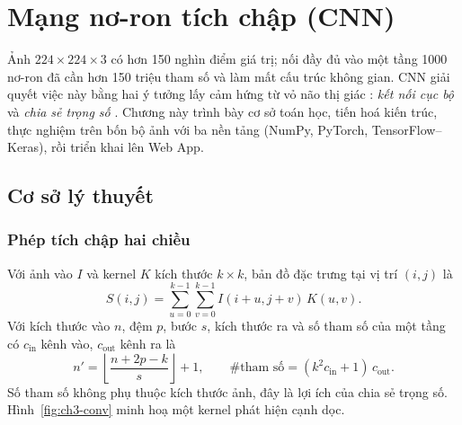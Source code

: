 \chapter{Mạng nơ-ron tích chập (CNN)}\label{chap:cnn}

Ảnh $224\times224\times3$ có hơn 150 nghìn điểm giá trị; nối đầy đủ vào một tầng 1000 nơ-ron đã cần hơn 150 triệu tham số và làm mất cấu trúc không gian. CNN giải quyết việc này bằng hai ý tưởng lấy cảm hứng từ
vỏ não thị giác \cite{ch3:hubel1962,ch3:fukushima1980}: \emph{kết nối cục bộ} và \emph{chia sẻ trọng số} \cite{ch3:lecun1989,ch1:lecun1998}. Chương này trình bày cơ sở toán học, tiến hoá kiến trúc, thực nghiệm trên bốn bộ ảnh với
ba nền tảng (NumPy, PyTorch, TensorFlow--Keras), rồi triển khai lên Web App.

\section{Cơ sở lý thuyết}\label{sec:cnn-theory}

\subsection{Phép tích chập hai chiều}
Với ảnh vào $I$ và kernel $K$ kích thước $k\times k$, bản đồ đặc trưng tại vị trí $(i,j)$ là
\begin{equation}
  S(i,j)=\sum_{u=0}^{k-1}\sum_{v=0}^{k-1} I(i+u,j+v)\,K(u,v).
\end{equation}
Với kích thước vào $n$, đệm $p$, bước $s$, kích thước ra và số tham số của một tầng có $c_{\text{in}}$ kênh vào, $c_{\text{out}}$ kênh ra là
\begin{equation}
  n'=\left\lfloor\frac{n+2p-k}{s}\right\rfloor+1,\qquad \#\text{tham số}=(k^2c_{\text{in}}+1)\,c_{\text{out}}.
\end{equation}
Số tham số không phụ thuộc kích thước ảnh, đây là lợi ích của chia sẻ trọng số. Hình~\ref{fig:ch3-conv} minh hoạ một kernel phát hiện cạnh dọc.


